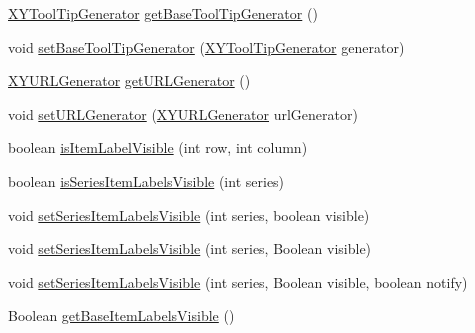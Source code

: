 \begin{DoxyCompactItemize}
\item 
\mbox{\hyperlink{interfaceorg_1_1jfree_1_1chart_1_1labels_1_1_x_y_tool_tip_generator}{X\+Y\+Tool\+Tip\+Generator}} \mbox{\hyperlink{interfaceorg_1_1jfree_1_1chart_1_1renderer_1_1xy_1_1_x_y_item_renderer_ad56671cc8a9a90acdf7eae3339a0d068}{get\+Base\+Tool\+Tip\+Generator}} ()
\item 
void \mbox{\hyperlink{interfaceorg_1_1jfree_1_1chart_1_1renderer_1_1xy_1_1_x_y_item_renderer_ae53df47412e048dfb68cf0cdf578c394}{set\+Base\+Tool\+Tip\+Generator}} (\mbox{\hyperlink{interfaceorg_1_1jfree_1_1chart_1_1labels_1_1_x_y_tool_tip_generator}{X\+Y\+Tool\+Tip\+Generator}} generator)
\item 
\mbox{\hyperlink{interfaceorg_1_1jfree_1_1chart_1_1urls_1_1_x_y_u_r_l_generator}{X\+Y\+U\+R\+L\+Generator}} \mbox{\hyperlink{interfaceorg_1_1jfree_1_1chart_1_1renderer_1_1xy_1_1_x_y_item_renderer_aa4ef599fb2f7154cade595bca496f98a}{get\+U\+R\+L\+Generator}} ()
\item 
void \mbox{\hyperlink{interfaceorg_1_1jfree_1_1chart_1_1renderer_1_1xy_1_1_x_y_item_renderer_af97976534963161b4cc9bb0615ad3cfc}{set\+U\+R\+L\+Generator}} (\mbox{\hyperlink{interfaceorg_1_1jfree_1_1chart_1_1urls_1_1_x_y_u_r_l_generator}{X\+Y\+U\+R\+L\+Generator}} url\+Generator)
\item 
boolean \mbox{\hyperlink{interfaceorg_1_1jfree_1_1chart_1_1renderer_1_1xy_1_1_x_y_item_renderer_a42da78278b72fa6d468a5f3c8a8c1c27}{is\+Item\+Label\+Visible}} (int row, int column)
\item 
boolean \mbox{\hyperlink{interfaceorg_1_1jfree_1_1chart_1_1renderer_1_1xy_1_1_x_y_item_renderer_a29dbe1dc22ee0ca0c7bd5f8e55f89179}{is\+Series\+Item\+Labels\+Visible}} (int series)
\item 
void \mbox{\hyperlink{interfaceorg_1_1jfree_1_1chart_1_1renderer_1_1xy_1_1_x_y_item_renderer_ac8dda02e1e154986e830141903f0a892}{set\+Series\+Item\+Labels\+Visible}} (int series, boolean visible)
\item 
void \mbox{\hyperlink{interfaceorg_1_1jfree_1_1chart_1_1renderer_1_1xy_1_1_x_y_item_renderer_a4b91b18aff9150ed864601e3a10d41f5}{set\+Series\+Item\+Labels\+Visible}} (int series, Boolean visible)
\item 
void \mbox{\hyperlink{interfaceorg_1_1jfree_1_1chart_1_1renderer_1_1xy_1_1_x_y_item_renderer_a49548687eb66f70ef866a7d8147f661e}{set\+Series\+Item\+Labels\+Visible}} (int series, Boolean visible, boolean notify)
\item 
Boolean \mbox{\hyperlink{interfaceorg_1_1jfree_1_1chart_1_1renderer_1_1xy_1_1_x_y_item_renderer_ae4e0917061a6ac9dc7d4aecae71890c5}{get\+Base\+Item\+Labels\+Visible}} ()

\end{DoxyCompactItemize}
